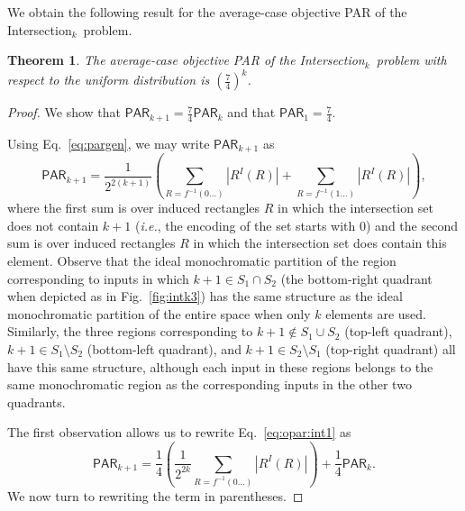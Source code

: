 \documentclass{article}
\theoremstyle{theorem}
\newtheorem{theorem}{Theorem}[section]
\theoremstyle{definition}
\theoremstyle{remark}
\newcommand{\ie}{\emph{i.e.}}
\newcommand{\PAR}{\ensuremath{\mathsf{PAR}}}
\newcommand{\intersection}{{\sc In\-ter\-sec\-tion}\ensuremath{_k}}
\begin{document}
We obtain the following result for the average-case objective PAR of the \intersection\ problem.
\begin{theorem}
The average-case objective PAR of the \intersection\ problem with respect to the uniform distribution is $\left(\frac{7}{4}\right)^k$.
\end{theorem}
\begin{proof}
We show that $\PAR_{k+1} = \frac{7}{4}\PAR_k$ and that $\PAR_1 = \frac{7}{4}$.

Using Eq.~\ref{eq:pargen}, we may write $\PAR_{k+1}$ as
\begin{equation}
\PAR_{k+1} = \frac{1}{2^{2(k+1)}} \left(\sum_{R=f^{-1}(0\ldots)} |R^I(R)| + \sum_{R=f^{-1}(1\ldots)} |R^I(R)|\right),\label{eq:opar:int1}
\end{equation}
where the first sum is over induced rectangles $R$ in which the intersection set does not contain $k+1$ (\ie, the encoding of the set starts with 0) and the second sum is over induced rectangles $R$ in which the intersection set does contain this element.  Observe that the ideal monochromatic partition of the region corresponding to inputs in which $k+1\in S_1\cap S_2$ (the bottom-right quadrant when depicted as in Fig.~\ref{fig:intk3}) has the same structure as the ideal monochromatic partition of the entire space when only $k$ elements are used.  Similarly, the three regions corresponding to $k+1\notin S_1\cup S_2$ (top-left quadrant), $k+1\in S_1\setminus S_2$ (bottom-left quadrant), and $k+1\in S_2\setminus S_1$ (top-right quadrant) all have this same structure, although each input in these regions belongs to the same monochromatic region as the corresponding inputs in the other two quadrants.

The first observation allows us to rewrite Eq.~\ref{eq:opar:int1} as
\begin{equation}
\PAR_{k+1} = \frac{1}{4}\left(\frac{1}{2^{2k}}\sum_{R=f^{-1}(0\ldots)} |R^I(R)|\right) + \frac{1}{4}\PAR_k.\label{eq:opar:int2}
\end{equation}
We now turn to rewriting the term in parentheses.


\end{proof}
\end{document}
